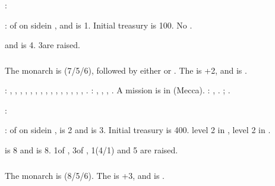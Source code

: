 :
\begin{modlist}
\item[\MA] \paysKazan
\item[\RM] \paysCrimee
\end{modlist}

:
\bparag \MNU of  on side\facemoins in \provinceNovgorod, \FTI and
\DTI is 1.
\bparag Initial treasury is 100\ducats.
\bparag No \TradeFLEET.

\aparag {} and  is
4. 3\ARMY\faceplus are raised.


\subsubsection{\paysmajeurTurquie}
\aparag The monarch is  (7/5/6), followed by either
 or \monarqueSuleyman. The \STAB is +2, and \TUR is
.

: \provinceTrakya, \provinceCanakkale,
\provinceIzmir, \provinceBursa, \provinceMakedonya, \provinceBulgaristan,
\provinceKosovo, \provinceRumeli, \provinceKocaeli, \provinceTrabzon,
\provinceAngora, \provinceSinop, \provinceAntalya, \provinceKonya,
\provinceAnadolu, \provinceKilikya.
: \provinceAlabania, \provinceHellas, \provinceMoreas,
\provinceCaffa.
 A mission is in  (Mecca).
: \seazoneRouge, \seazonePersique.
; .

:
\begin{modlist}
\item[\RM] \paysmoldavie
\item[\VASSAL] \paysvalachie
\end{modlist}

:
\bparag \MNU of  on side\facemoins in \provinceTrakya, \FTI is 2 and
\DTI is 3.
\bparag Initial treasury is 400\ducats.
\bparag \TradeFLEET level 2 in , level 2 in .

\aparag {} is 8 and  is
8. 1\ARMY\facemoins of \Janissaire, 3\ARMY\faceplus of \Timar,
1\FLEET\facemoins (4\NGD/1\NTD) and 5 \Pashas are raised.


\subsubsection{\paysmajeurVenise}
\aparag The monarch is \monarqueBarbarigo (8/5/6). The \STAB is +3, and \VEN
is .

